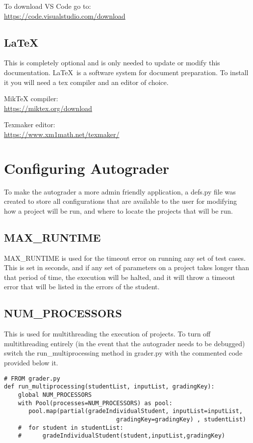 \documentclass[10pt,a4paper]{book}
\begin{document}
To download VS Code go to: \\
\href{https://code.visualstudio.com/download}{https://code.visualstudio.com/download}

\section{\LaTeX}
This is completely optional and is only needed to update or modify this documentation. \LaTeX\  is a software system for document preparation. To install it you will need a tex compiler and an editor of choice.

MikTeX compiler: \\
\href{https://miktex.org/download}{https://miktex.org/download}

Texmaker editor: \\
\href{https://www.xm1math.net/texmaker/}{https://www.xm1math.net/texmaker/}

\chapter{Configuring Autograder}
To make the autograder a more admin friendly application, a defs.py file was created to store all configurations that are available to the user for modifying how a project will be run, and where to locate the projects that will be run.

\section{MAX\_RUNTIME}
MAX\_RUNTIME is used for the timeout error on running any set of test cases. This is set in seconds, and if any set of parameters on a project takes longer than that period of time, the execution will be halted, and it will throw a timeout error that will be listed in the errors of the student.

\section{NUM\_PROCESSORS}
This is used for multithreading the execution of projects. 
To turn off multithreading entirely (in the event that the autograder needs to be debugged) switch the run\_multiprocessing method in grader.py with the commented code provided below it.

\begin{verbatim}
# FROM grader.py
def run_multiprocessing(studentList, inputList, gradingKey):
    global NUM_PROCESSORS
    with Pool(processes=NUM_PROCESSORS) as pool:
       pool.map(partial(gradeIndividualStudent, inputList=inputList,
        						gradingKey=gradingKey) , studentList)
    #  for student in studentList:
    #      gradeIndividualStudent(student,inputList,gradingKey)
\end{verbatim}
\end{document}

